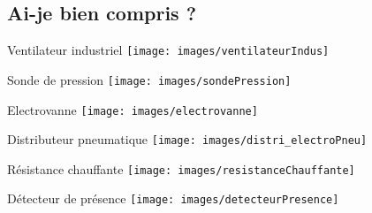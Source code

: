 \subsection{Ai-je bien compris ? }
\begin{UPSTIactivite}

\begin{minipage}[b]{0.24\textwidth}
\centering
  Ventilateur industriel
  \texttt{[image: images/ventilateurIndus]}


\end{minipage}
\begin{minipage}[b]{0.24\textwidth}
\centering
  Sonde de pression
  \texttt{[image: images/sondePression]}


\end{minipage}
\begin{minipage}[b]{0.24\textwidth}
\centering
  Electrovanne
  \texttt{[image: images/electrovanne]}


\end{minipage}
\begin{minipage}[b]{0.24\textwidth}
\centering
  Distributeur pneumatique
  \texttt{[image: images/distri\_electroPneu]}


\end{minipage}

\vspace*{0.5cm}

\begin{minipage}[b]{0.24\textwidth}
\centering
  Résistance chauffante
  \texttt{[image: images/resistanceChauffante]}


\end{minipage}
\begin{minipage}[b]{0.24\textwidth}
\centering
  Détecteur de présence
  \texttt{[image: images/detecteurPresence]}


\end{minipage}
\end{UPSTIactivite}
